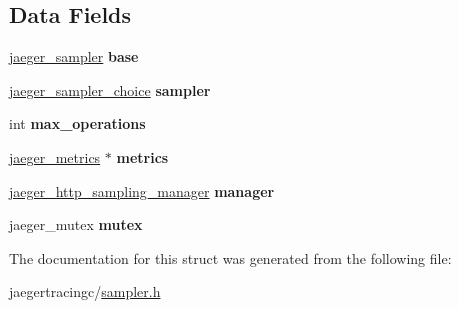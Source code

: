 \subsection*{Data Fields}
\begin{DoxyCompactItemize}
\item 
\mbox{\label{structjaeger__remotely__controlled__sampler_a3592c903ef829c6f6c89e6afb4478e93}} 
\mbox{\hyperlink{structjaeger__sampler}{jaeger\+\_\+sampler}} {\bfseries base}
\item 
\mbox{\label{structjaeger__remotely__controlled__sampler_ab46de8d8bcbf5a44266ed95d497011a1}} 
\mbox{\hyperlink{structjaeger__sampler__choice}{jaeger\+\_\+sampler\+\_\+choice}} {\bfseries sampler}
\item 
\mbox{\label{structjaeger__remotely__controlled__sampler_a7277191696e1359eb08feee4fce054ea}} 
int {\bfseries max\+\_\+operations}
\item 
\mbox{\label{structjaeger__remotely__controlled__sampler_a44c9fb79d8757e90613822c6a86639e4}} 
\mbox{\hyperlink{structjaeger__metrics}{jaeger\+\_\+metrics}} $\ast$ {\bfseries metrics}
\item 
\mbox{\label{structjaeger__remotely__controlled__sampler_a9023d486696089b80f887c231c131499}} 
\mbox{\hyperlink{structjaeger__http__sampling__manager}{jaeger\+\_\+http\+\_\+sampling\+\_\+manager}} {\bfseries manager}
\item 
\mbox{\label{structjaeger__remotely__controlled__sampler_ae938cdffd5db68aaeab43770b0ab385f}} 
jaeger\+\_\+mutex {\bfseries mutex}
\end{DoxyCompactItemize}


The documentation for this struct was generated from the following file\+:\begin{DoxyCompactItemize}
\item 
jaegertracingc/\mbox{\hyperlink{sampler_8h}{sampler.\+h}}\end{DoxyCompactItemize}

